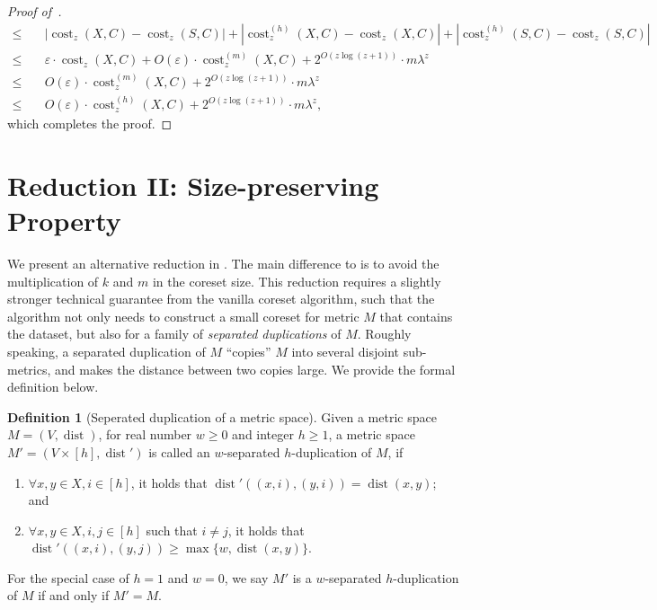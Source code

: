 \documentclass[letterpaper,11pt]{article}
\theoremstyle{plain}
\theoremstyle{definition}
\newtheorem{definition}[theorem]{Definition}
\theoremstyle{remark}
\DeclareMathOperator{\cost}{cost}
\DeclareMathOperator{\dist}{dist}
\newcommand{\eps}{\varepsilon}
\begin{document}
\begin{proof}[Proof of~]
\begin{align*}
        \le&\quad \left|\cost_z(X,C) - \cost_z(S,C) \right| + \left|\cost_z^{(h)}(X,C) - \cost_z(X,C) \right| + \left|\cost_z^{(h)}(S,C) - \cost_z(S,C) \right|\\
        \le&\quad \eps\cdot \cost_z(X,C) + O(\eps)\cdot \cost_z^{(m)}(X,C) + 2^{O(z\log (z+1))}\cdot m\lambda^z\\
        \le&\quad O(\eps)\cdot \cost_z^{(m)}(X,C) + 2^{O(z\log(z+1))}\cdot m\lambda^z\\
        \le&\quad O(\eps)\cdot \cost_z^{(h)}(X,C) + 2^{O(z\log(z+1))}\cdot m\lambda^z,
    \end{align*}
    which completes the proof.
\end{proof}

 
\section{Reduction II: Size-preserving Property}
\label{sec:reduction2}

We present an alternative reduction in .
The main difference to  is to avoid the multiplication of $k$ and $m$ in the coreset size.
This reduction requires a slightly stronger technical guarantee from the vanilla coreset algorithm,
such that the algorithm not only needs to construct a small coreset for metric $M$ that contains the dataset,
but also for a family of \emph{separated duplications} of $M$.
Roughly speaking, a separated duplication of $M$ ``copies'' $M$ into several disjoint sub-metrics, and makes the distance between two copies large.  We provide the formal definition below.





\begin{definition}[Seperated duplication of a metric space]
    \label{def:separated duplication}
    Given a metric space $M=(V,\dist)$, for real number $w\ge 0$ and integer $h\ge 1$, a metric space $M'=(V\times [h],\dist')$ is called an $w$-separated $h$-duplication of $M$, if 
    \begin{enumerate}
        \item $\forall x,y\in X, i\in [h]$, it holds that $\dist'((x,i),(y,i)) = \dist(x,y)$; and
        \item $\forall x,y\in X, i,j\in [h]$ such that $i\neq j$, it holds that $\dist'((x,i),(y,j))\ge \max\{w,\dist(x,y)\}$.
    \end{enumerate}
    For the special case of $h = 1$ and $w = 0$, we say $M'$ is a $w$-separated $h$-duplication of $M$ if and only if $M'=M$.
\end{definition}
\end{document}
